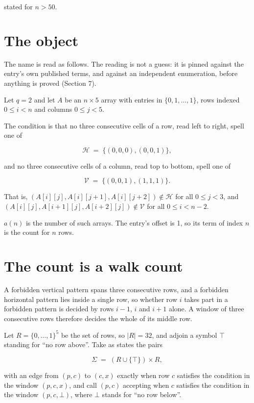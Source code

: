 \documentclass[11pt]{article}
\theoremstyle{definition}
\begin{document}
stated for $n > 50$.

\section{The object}

The name is read as follows. The reading is not a guess: it is pinned against the entry's own published terms, and against an independent enumeration, before anything is proved (Section 7).

Let $q = 2$ and let $A$ be an $n \times 5$ array with entries in $\{0,1,\dots,1\}$, rows indexed $0 \le i < n$ and columns $0 \le j < 5$.

The condition is that no three consecutive cells of a row, read left to right, spell one of

\[\mathcal{H} \;=\; \{(0,0,0), (0,0,1)\},\]

and no three consecutive cells of a column, read top to bottom, spell one of

\[\mathcal{V} \;=\; \{(0,0,1), (1,1,1)\}.\]

That is, $(A[i][j],A[i][j{+}1],A[i][j{+}2]) \notin \mathcal{H}$ for all $0 \le j < 3$, and $(A[i][j],A[i{+}1][j],A[i{+}2][j]) \notin \mathcal{V}$ for all $0 \le i < n-2$.

$a(n)$ is the number of such arrays. The entry's offset is 1, so its term of index $n$ is the count for $n$ rows.

\section{The count is a walk count}

A forbidden vertical pattern spans three consecutive rows, and a forbidden horizontal pattern lies inside a single row, so whether row $i$ takes part in a forbidden pattern is decided by rows $i-1$, $i$ and $i+1$ alone. A window of three consecutive rows therefore decides the whole of its middle row.

Let $R = \{0,\dots,1\}^{5}$ be the set of rows, so $|R| = 32$, and adjoin a symbol $\top$ standing for ``no row above''. Take as states the pairs

\[\Sigma \;=\; (R \cup \{\top\}) \times R,\]

with an edge from $(p,c)$ to $(c,x)$ exactly when row $c$ satisfies the condition in the window $(p,c,x)$, and call $(p,c)$ accepting when $c$ satisfies the condition in the window $(p,c,\bot)$, where $\bot$ stands for ``no row below''.
\end{document}
